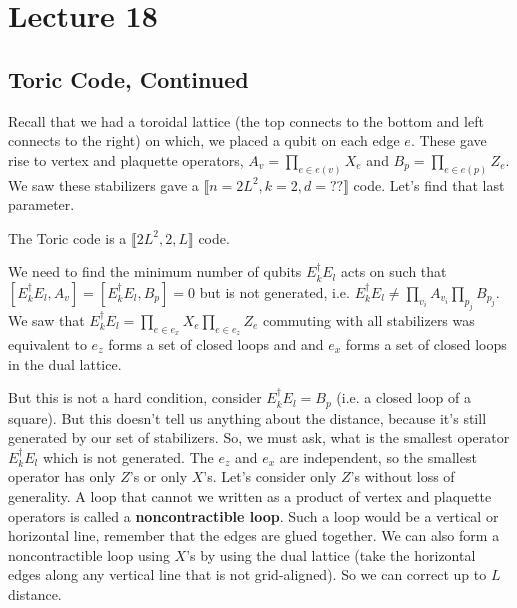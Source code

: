 \section{Lecture 18}

\subsection{Toric Code, Continued}
Recall that we had a toroidal lattice (the top connects to the bottom and left connects to the right) on which, we placed
a qubit on each edge $e$. These gave rise to vertex and plaquette operators, $A_v = \prod_{e \in e(v)} X_e$ and $B_p = \prod_{e \in e(p)} Z_e$.
We saw these stabilizers gave a $\llbracket n = 2L^2, k = 2, d = ?? \rrbracket$ code. Let's find that last parameter.

\begin{theorem}
The Toric code is a $\llbracket 2L^2, 2, L \rrbracket$ code.

\begin{proof*}
    We need to find the minimum number of qubits
    $E^{\dagger}_k E_l$ acts on such that $[E_k^{\dagger} E_l, A_v] = [E_k^{\dagger} E_l, B_p] = 0$ but is not generated, i.e. $E_k^{\dagger} E_l \neq \prod_{v_i} A_{v_i} \prod_{p_j} B_{p_j}$.
    We saw that $E_k^{\dagger} E_l = \prod_{e \in e_x} X_e \prod_{e \in e_z} Z_e$ commuting with all stabilizers
    was equivalent to $e_z$ forms a set of closed loops and and $e_x$ forms a set of closed loops in the dual lattice. 

    But this is not a hard condition, consider
    $E_k^{\dagger} E_l = B_p$ (i.e. a closed loop of a square). But this doesn't tell us anything about the distance, because it's still generated by our set of stabilizers.
    So, we must ask, what is the smallest operator $E_k^{\dagger} E_l$ which is not generated. The $e_z$ and $e_x$ are independent, so the smallest
    operator has only $Z$'s or only $X$'s. Let's consider only $Z$'s without loss of generality. A loop that cannot we written as a product of vertex and plaquette operators is called a \textbf{noncontractible loop}.
    Such a loop would be a vertical or horizontal line, remember that the edges are glued together. We can also form a noncontractible loop using $X$'s by using the dual lattice (take the horizontal edges along any vertical line that is not grid-aligned).
    So we can correct up to $L$ distance.
\end{proof*}
\end{theorem}

